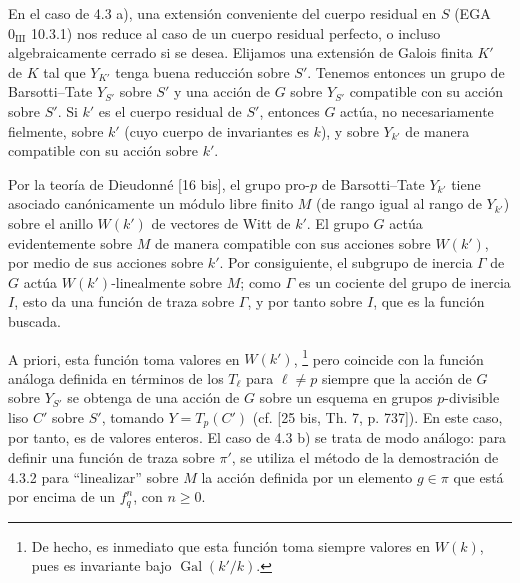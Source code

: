 En el caso de 4.3 a), una extensión conveniente del cuerpo residual en
$S$ (EGA $0_{\mathrm{III}}$ 10.3.1) nos reduce al caso de un cuerpo
residual perfecto, o incluso algebraicamente cerrado si se desea.
Elijamos una extensión de Galois finita $K'$ de $K$ tal que $Y_{K'}$
tenga buena reducción sobre $S'$. Tenemos entonces un grupo de
Barsotti--Tate $Y_{S'}$ sobre $S'$ y una acción de $G$ sobre $Y_{S'}$
compatible con su acción sobre $S'$. Si $k'$ es el cuerpo residual de
$S'$, entonces $G$ actúa, no necesariamente fielmente, sobre $k'$ (cuyo
cuerpo de invariantes es $k$), y sobre $Y_{k'}$ de manera compatible
con su acción sobre $k'$.


Por la teoría de Dieudonné [16 bis], el grupo pro-$p$ de
Barsotti--Tate $Y_{k'}$ tiene asociado canónicamente un módulo libre
finito $M$ (de rango igual al rango de $Y_{k'}$) sobre el anillo
$W(k')$ de vectores de Witt de $k'$. El grupo $G$ actúa evidentemente
sobre $M$ de manera compatible con sus acciones sobre $W(k')$, por
medio de sus acciones sobre $k'$. Por consiguiente, el subgrupo de
inercia $\Gamma$ de $G$ actúa $W(k')$-linealmente sobre $M$; como
$\Gamma$ es un cociente del grupo de inercia $I$, esto da una función
de traza sobre $\Gamma$, y por tanto sobre $I$, que es la función
buscada.

A priori, esta función toma valores en $W(k')$,
\footnote{De hecho, es inmediato que esta función toma siempre valores
en $W(k)$, pues es invariante bajo $\operatorname{Gal}(k'/k)$.}
pero coincide con la función análoga definida en términos de los
$T_\ell$ para $\ell\neq p$ siempre que la acción de $G$ sobre $Y_{S'}$
se obtenga de una acción de $G$ sobre un esquema en grupos
$p$-divisible liso $C'$ sobre $S'$, tomando $Y=T_p(C')$ (cf. [25 bis,
Th. 7, p. 737]). En este caso, por tanto, es de valores enteros. El caso
de 4.3 b) se trata de modo análogo: para definir una función de traza
sobre $\pi'$, se utiliza el método de la demostración de 4.3.2 para
``linealizar'' sobre $M$ la acción definida por un elemento $g\in\pi$
que está por encima de un $f_q^n$, con $n\geq0$.
